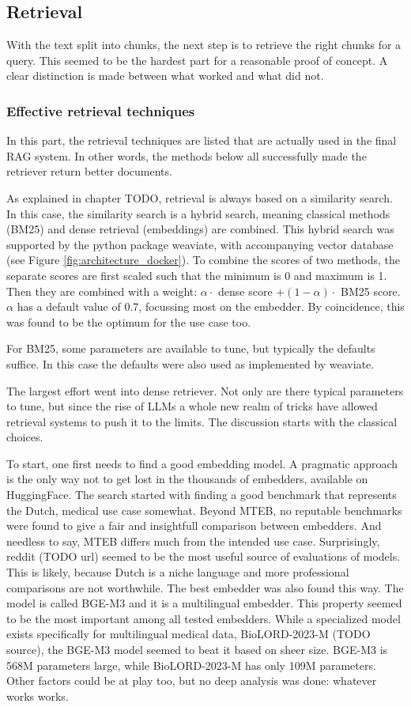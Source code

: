 \subsection{Retrieval}
With the text split into chunks, the next step is to retrieve the right chunks for a query. This seemed to be the hardest part for a reasonable proof of concept. A clear distinction is made between what worked and what did not.

\subsubsection{Effective retrieval techniques}
In this part, the retrieval techniques are listed that are actually used in the final RAG system. In other words, the methods below all successfully made the retriever return better documents.

As explained in chapter TODO, retrieval is always based on a similarity search. In this case, the similarity search is a hybrid search, meaning classical methods (BM25) and dense retrieval (embeddings) are combined. This hybrid search was supported by the python package weaviate, with accompanying vector database (see Figure \ref{fig:architecture_docker}). To combine the scores of two methods, the separate scores are first scaled such that the minimum is 0 and maximum is 1. Then they are combined with a weight: $\alpha \cdot $ dense score $ + (1-\alpha) \cdot $ BM25 score. $\alpha$ has a default value of 0.7, focussing most on the embedder. By coincidence, this was found to be the optimum for the use case too.

For BM25, some parameters are available to tune, but typically the defaults suffice. In this case the defaults were also used as implemented by weaviate.

The largest effort went into dense retriever. Not only are there typical parameters to tune, but since the rise of LLMs a whole new realm of tricks have allowed retrieval systems to push it to the limits. The discussion starts with the classical choices.

To start, one first needs to find a good embedding model. A pragmatic approach is the only way not to get lost in the thousands of embedders, available on HuggingFace. The search started with finding a good benchmark that represents the Dutch, medical use case somewhat. Beyond MTEB, no reputable benchmarks were found to give a fair and insightfull comparison between embedders. And needless to say, MTEB differs much from the intended use case. Surprisingly, reddit (TODO url) seemed to be the most useful source of evaluations of models. This is likely, because Dutch is a niche language and more professional comparisons are not worthwhile. The best embedder was also found this way. The model is called BGE-M3 and it is a multilingual embedder. This property seemed to be the most important among all tested embedders. While a specialized model exists specifically for multilingual medical data, BioLORD-2023-M (TODO source), the BGE-M3 model seemed to beat it based on sheer size. BGE-M3 is 568M parameters large, while BioLORD-2023-M has only 109M parameters. Other factors could be at play too, but no deep analysis was done: whatever works works.

